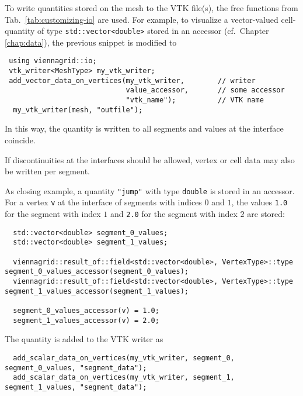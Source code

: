  To write quantities stored on the mesh to the VTK file(s), the free functions from Tab.~\ref{tab:customizing-io} are used.
 For example, to visualize a vector-valued cell-quantity of type \lstinline|std::vector<double>| stored in an accessor (cf.~Chapter \ref{chap:data}), the previous snippet is modified to
 \begin{lstlisting}
 using viennagrid::io;
 vtk_writer<MeshType> my_vtk_writer;
 add_vector_data_on_vertices(my_vtk_writer,        // writer
                             value_accessor,       // some accessor
                             "vtk_name");          // VTK name
  my_vtk_writer(mesh, "outfile");
 \end{lstlisting}
 In this way, the quantity is written to all segments and values at the interface coincide.

 If discontinuities at the interfaces should be allowed, vertex or cell data may also be written per segment.

 \pagebreak

 As closing example, a quantity \lstinline|"jump"| with type \lstinline|double| is stored in an accessor.
 For a vertex \lstinline|v| at the interface of segments with indices $0$ and $1$, the values \lstinline|1.0| for the segment with index $1$ and \lstinline|2.0| for the segment with index $2$ are stored:
 \begin{lstlisting}
  std::vector<double> segment_0_values;
  std::vector<double> segment_1_values;

  viennagrid::result_of::field<std::vector<double>, VertexType>::type segment_0_values_accessor(segment_0_values);
  viennagrid::result_of::field<std::vector<double>, VertexType>::type segment_1_values_accessor(segment_1_values);

  segment_0_values_accessor(v) = 1.0;
  segment_1_values_accessor(v) = 2.0;
 \end{lstlisting}

 The quantity is added to the VTK writer as
 \begin{lstlisting}
  add_scalar_data_on_vertices(my_vtk_writer, segment_0, segment_0_values, "segment_data");
  add_scalar_data_on_vertices(my_vtk_writer, segment_1, segment_1_values, "segment_data");
 \end{lstlisting}

